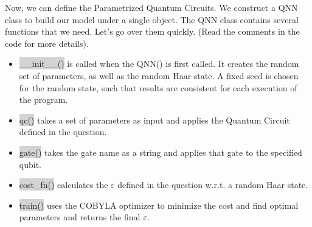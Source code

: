 \documentclass[11pt]{article}
\begin{document}
    Now, we can define the Parametrized Quantum Circuits. We construct a QNN
class to build our model under a single object. The QNN class contains
several functions that we need. Let's go over them quickly. (Read the
comments in the code for more details).
\begin{itemize}
 \item \colorbox{lightgray}{\_\_init\_\_()} is
called when the QNN() is first called. It creates the random set of
parameters, as well as the random Haar state. A fixed seed is chosen for
the random state, such that results are consistent for each execution of
the program. 
 \item \colorbox{lightgray}{qc()} takes a set of parameters as input and
applies the Quantum Circuit defined in the question. 
\item  \colorbox{lightgray}{gate()}
takes the gate name as a string and applies that gate to the specified qubit.
\item  \colorbox{lightgray}{cost\_fn()} calculates the \(\varepsilon\) defined in
the question w.r.t. a random Haar state. 
\item  \colorbox{lightgray}{train()} uses the
COBYLA optimizer to minimize the cost and find optimal parameters and
returns the final \(\varepsilon\).
\end{itemize}
\newpage
\end{document}

